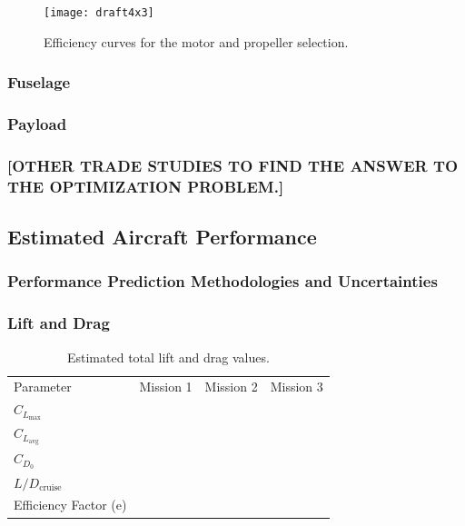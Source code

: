 \documentclass[report]{byu-aero}
\begin{document}
\begin{figure}[h!]
	\centering
	\texttt{[image: draft4x3]}
	\caption{Efficiency curves for the motor and propeller selection.}
	\label{fig:propefficiency}
\end{figure}



\subsubsection{Fuselage}



\subsubsection{Payload}

\subsubsection{\color{\BYUred} [OTHER TRADE STUDIES TO FIND THE ANSWER TO THE OPTIMIZATION PROBLEM.]}



\subsection{Estimated Aircraft Performance}
\label{ssec:estaircraftperfomance}


\subsubsection{Performance Prediction Methodologies and Uncertainties}
\label{sssec:uncertaintyanalysis}



\subsubsection{Lift and Drag}
\label{sssec:liftdrag}

\begin{table}[h!]
	\centering
	\caption{Estimated total lift and drag values.}
	\label{tab:estimatedLD}
	\begin{tabular}{ C{1in}  C{1in}  C{1in}  C{1in}}
		
		Parameter & Mission 1 & Mission 2 & Mission 3 \\
		
		\(C_{L_\text{max}}\) & & &\\
		
		\(C_{L_\text{avg}}\) & & &\\
		
		\(C_{D_0}\) & & &\\
		
		\(L/D_\text{cruise}\) & & &\\
		
		Efficiency Factor (e) & & & \\
		
	\end{tabular}
\end{table}
\end{document}
